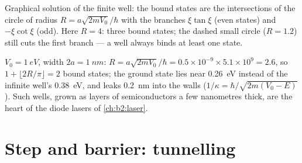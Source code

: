 \begin{omfigure}

{\small Graphical solution of the finite well: the bound states are
the intersections of the circle of radius $R = a\sqrt{2mV_0}/\hbar$ with
the branches $\xi\tan\xi$ (even states) and $-\xi\cot\xi$ (odd). Here
$R = 4$: three bound states; the dashed small circle ($R = 1.2$) still
cuts the first branch --- a well always binds at least one state.}
\end{omfigure}

\begin{example}\label{ex:b2:potential-wells-tunneling:finite}
$V_0 = \qty{1}{eV}$, width $2a = \qty{1}{nm}$: $R = a\sqrt{2mV_0}/\hbar = 0.5 \times
10^{-9} \times 5.1 \times 10^9 = 2.6$, so $1 + \lfloor 2R/\pi\rfloor = 2$ bound
states; the ground state lies near \qty{0.26}{eV} instead of the infinite
well's \qty{0.38}{eV}, and leaks \qty{0.2}{nm} into the walls
($1/\kappa = \hbar/\sqrt{2m(V_0 - E)}$). Such wells, grown as layers of
semiconductors a few nanometres thick, are the heart of the diode
lasers of \cref{ch:b2:laser}.
\end{example}

\section{Step and barrier: tunnelling}

